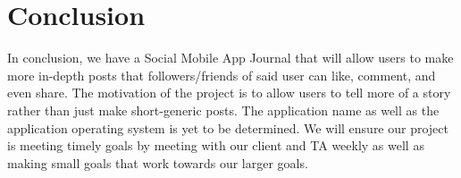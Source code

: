 \documentclass[letterpaper, 10, draftclsnofoot,onecolumn]{IEEEtran}
\begin{document}
\section*{Conclusion} In conclusion, we have a Social Mobile App Journal that will allow users to make more in-depth posts that followers/friends of said user can like, comment, and even share. The motivation of the project is to allow users to tell more of a story rather than just make short-generic posts. The application name as well as the application operating system is yet to be determined. We will ensure our project is meeting timely goals by meeting with our client and TA weekly as well as making small goals that work towards our larger goals. 
\end{document}
